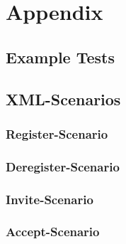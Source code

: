 \section{Appendix}
\label{sec:appendix}

\subsection{Example Tests}

\subsection{XML-Scenarios}
\subsubsection{Register-Scenario}
\subsubsection{Deregister-Scenario}
\subsubsection{Invite-Scenario}
\subsubsection{Accept-Scenario}
